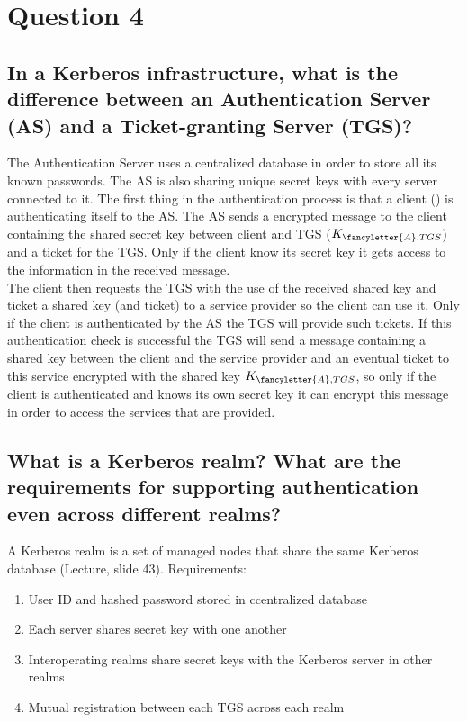 \documentclass{report}
\begin{document}
	\section{Question 4}
	\startsection
		\renewcommand{\thesubsection}{\thesection.\Alph{subsection}}
		\subsection{In a Kerberos infrastructure, what is the difference between an Authentication Server (AS) and a Ticket-granting Server (TGS)?}
		\startsubsection
			The Authentication Server uses a centralized database in order to store all its known passwords. The AS is also sharing unique secret keys with every server connected to it. The first thing in the authentication process is that a client () is authenticating itself to the AS. The AS sends a encrypted message to the client containing the shared secret key between client and TGS ($K_{\fancyletter{A},TGS}$) and a ticket for the TGS. Only if the client know its secret key it gets access to the information in the received message. \\
			The client then requests the TGS with the use of the received shared key and ticket a shared key (and ticket) to a service provider so the client can use it. Only if the client is authenticated by the AS the TGS will provide such tickets. If this authentication check is successful the TGS will send a message containing a shared key between the client and the service provider and an eventual ticket to this service encrypted with the shared key $K_{\fancyletter{A},TGS}$, so only if the client is authenticated and knows its own secret key it can encrypt this message in order to access the services that are provided.
		\closesection
		
		\subsection{What is a Kerberos realm? What are the requirements for supporting authentication even across different realms?}
		\startsubsection
			A Kerberos realm is a set of managed nodes that share the same Kerberos database (Lecture, slide 43). Requirements:
			\begin{enumerate}[-]
				\item User ID and hashed password stored in ccentralized database
				\item Each server shares secret key with one another
				\item Interoperating realms share secret keys with the Kerberos server in other realms
				\item Mutual registration between each TGS across each realm
			\end{enumerate}
		\closesection
		
\end{document}
